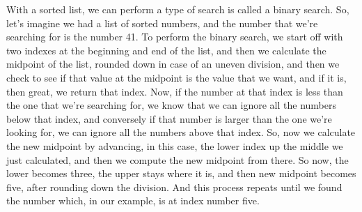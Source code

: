 With a sorted list, we can perform a type of search is called a binary search. So, let's 
imagine we had a list of sorted numbers, and the number that we're searching for is the number
 41. To perform the binary search, we start off with two indexes at the beginning and end of 
 the list, and then we calculate the midpoint of the list, rounded down in case of an uneven 
 division, and then we check to see if that value at the midpoint is the value that we want, 
 and if it is, then great, we return that index. Now, if the number at that index is less than
  the one that we're searching for, we know that we can ignore all the numbers below that 
  index, and conversely if that number is larger than the one we're looking for, we can ignore
   all the numbers above that index. So, now we calculate the new midpoint by advancing, in 
   this case, the lower index up the middle we just calculated, and then we compute the new 
   midpoint from there. So now, the lower becomes three, the upper stays where it is, and then 
   new midpoint becomes five, after rounding down the division. And this process repeats until 
   we found the number which, in our example, is at index number five. 
   
